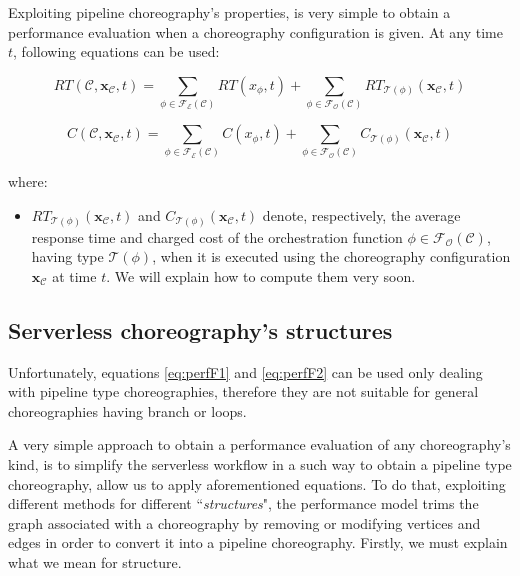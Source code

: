 \documentclass[12pt,a4paper]{report}
\newcommand{\ItalicQuotMark}[1]{``\textit{#1}"}
\begin{document}
Exploiting pipeline choreography's properties, is very simple to obtain a performance evaluation when a choreography configuration is given. At any time $t$, following equations can be used:

\begin{equation}\label{eq:perfF1}
	RT(\mathcal{C},\textbf{x}_{\mathcal{C}}, t) = \sum_{\phi \in \mathscr{F_E}(\mathcal{C})} RT(x_{\phi},t) + \sum_{\phi \in \mathscr{F_O}(\mathcal{C})} RT_{\mathscr{T}(\phi)}(\textbf{x}_{\mathcal{C}}, t)
\end{equation}

\begin{equation}\label{eq:perfF2}
	C(\mathcal{C},\textbf{x}_{\mathcal{C}}, t) = \sum_{\phi \in \mathscr{F_E}(\mathcal{C})} C(x_{\phi},t) + \sum_{\phi \in \mathscr{F_O}(\mathcal{C})} C_{\mathscr{T}(\phi)}(\textbf{x}_{\mathcal{C}}, t)
\end{equation}

where:

\begin{itemize}
	\item $RT_{\mathscr{T}(\phi)}(\textbf{x}_{\mathcal{C}}, t)$ and $C_{\mathscr{T}(\phi)}(\textbf{x}_{\mathcal{C}}, t)$ denote, respectively, the average response time and charged cost of the orchestration function $\phi \in \mathscr{F_O}(\mathcal{C})$, having type $\mathscr{T}(\phi)$, when it is executed using the choreography configuration $\textbf{x}_{\mathcal{C}}$ at time $t$. We will explain how to compute them very soon.
\end{itemize}

\subsection{Serverless choreography's structures}

Unfortunately, equations \ref{eq:perfF1} and \ref{eq:perfF2} can be used only dealing with pipeline type choreographies, therefore they are not suitable for general choreographies having branch or loops. 

A very simple approach to obtain a performance evaluation of any choreography's kind, is to simplify the serverless workflow in a such way to obtain a pipeline type choreography, allow us to apply aforementioned equations. To do that, exploiting different methods for different \ItalicQuotMark{structures}, the performance model trims the graph associated with a choreography by removing or modifying vertices and edges in order to convert it into a pipeline choreography. Firstly, we must explain what we mean for structure.
\end{document}
